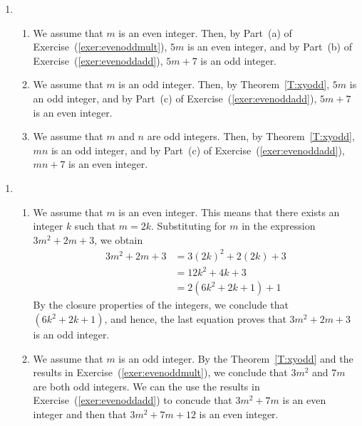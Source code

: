 \begin{enumerate}
\item \begin{enumerate} 
\item We assume that $m$ is an even integer.  Then, by Part~(a) of 
Exercise~(\ref{exer:evenoddmult}), $5m$ is an even integer, and by Part~(b) of 
Exercise~(\ref{exer:evenoddadd}), $5m + 7$ is an odd integer.

\item We assume that $m$ is an odd integer.  Then, by Theorem~\ref{T:xyodd}, $5m$ is an odd integer, and by Part~(c) of Exercise~(\ref{exer:evenoddadd}), $5m + 7$ is an even integer.

\item We assume that $m$ and $n$ are odd integers.  Then, by Theorem~\ref{T:xyodd}, $mn$ is an odd integer, and by Part~(c) of Exercise~(\ref{exer:evenoddadd}), $mn + 7$ is an even integer.
\end{enumerate}
\end{enumerate}


\begin{enumerate}
\item \begin{enumerate} 
\item We assume that $m$ is an even integer.  This means that there exists an integer $k$ such that $m = 2k$.  Substituting for $m$ in the expression $3m^2 + 2m + 3$, we obtain
\begin{align*}
3m^2 + 2m + 3 &= 3 \left( 2k \right)^2 + 2 \left( 2k \right) + 3 \\
              &= 12k^2 + 4k + 3 \\
              &= 2 \left( 6k^2 + 2k +1 \right) + 1
\end{align*}
By the closure properties of the integers, we conclude that $\left( 6k^2 + 2k +1 \right)$, and hence, the last equation proves that $3m^2 + 2m + 3$ is an odd integer.

\item We assume that $m$ is an odd integer.  By the Theorem~\ref{T:xyodd} and the results in Exercise~(\ref{exer:evenoddmult}), we conclude that $3m^2$ and $7m$ are both odd integers.  We can the use the results in Exercise~(\ref{exer:evenoddadd}) to concude that 
$3m^2 + 7m$ is an even integer and then that $3m^2 + 7m + 12$ is an even integer.
\end{enumerate}
\end{enumerate}



